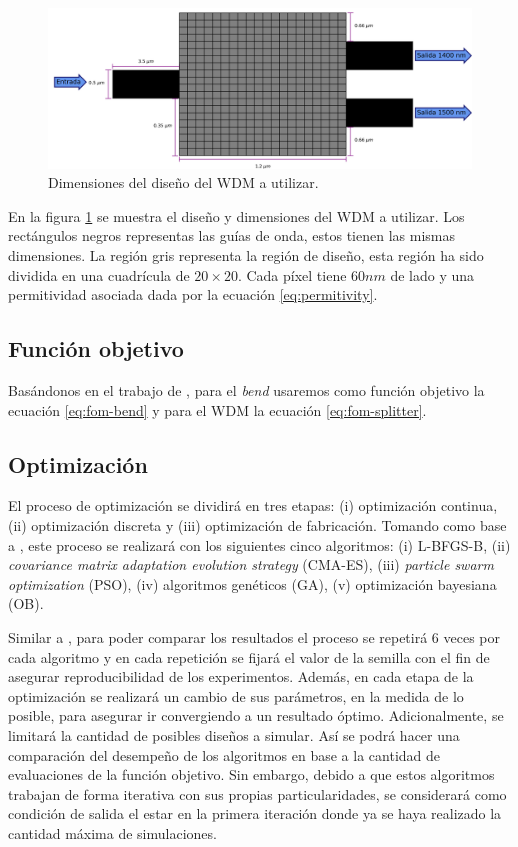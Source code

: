 \begin{figure}[ht]
  \centering
  \includegraphics[width=\textwidth]{image/proposal/demultiplexer.png}
  \caption{Dimensiones del diseño del WDM a utilizar.}
  \label{fig:dimensiones-demultiplexer}
\end{figure}

En la figura \ref{fig:dimensiones-demultiplexer} se muestra el diseño y dimensiones del WDM a utilizar.
Los rectángulos negros representas las guías de onda, estos tienen las mismas dimensiones.
La región gris representa la región de diseño, esta región ha sido dividida en una cuadrícula de $20 \times 20$.
Cada píxel tiene $60 nm$ de lado y una permitividad asociada dada por la ecuación \ref{eq:permitivity}.

\subsection{Función objetivo}

Basándonos en el trabajo de \cite{Su2020}, para el \emph{bend} usaremos como función objetivo la ecuación \ref{eq:fom-bend} y para el WDM la ecuación \ref{eq:fom-splitter}.

\subsection{Optimización}

El proceso de optimización se dividirá en tres etapas: (i) optimización continua, (ii) optimización discreta y (iii) optimización de fabricación.
Tomando como base a \cite{Elsawy2020, Schneider2019, Gregory2015}, este proceso se realizará con los siguientes cinco algoritmos: (i) L-BFGS-B, (ii) \emph{covariance matrix adaptation evolution strategy} (CMA-ES), (iii) \emph{particle swarm optimization} (PSO), (iv) algoritmos genéticos (GA), (v) optimización bayesiana (OB).

Similar a \cite{Schneider2019}, para poder comparar los resultados el proceso se repetirá 6 veces por cada algoritmo y en cada repetición se fijará el valor de la semilla con el fin de asegurar reproducibilidad de los experimentos.
Además, en cada etapa de la optimización se realizará un cambio de sus parámetros, en la medida de lo posible, para asegurar ir convergiendo a un resultado óptimo.
Adicionalmente, se limitará la cantidad de posibles diseños a simular.
Así se podrá hacer una comparación del desempeño de los algoritmos en base a la cantidad de evaluaciones de la función objetivo.
Sin embargo, debido a que estos algoritmos trabajan de forma iterativa con sus propias particularidades, se considerará como condición de salida el estar en la primera iteración donde ya se haya realizado la cantidad máxima de simulaciones.

